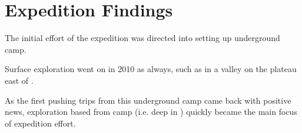 \section{Expedition Findings}

The initial effort of the expedition was directed into setting up underground camp.

    \begin{marginfigure}
\checkoddpage \ifoddpage \forcerectofloat \else \forceversofloat \fi
\centering
 \caption{Surface exploration went on in 2010 as always, such as in a valley on the plateau east of . }
 \label{valley east of Mig}
\end{marginfigure}

As the first pushing trips from this underground camp came back with
positive news, exploration based from camp (i.e. deep in ) quickly became the main focus of expedition effort.

